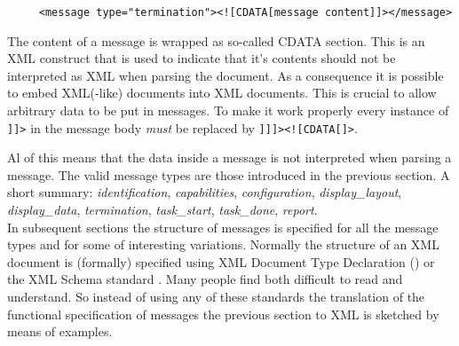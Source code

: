 \documentclass{article}
\begin{document}
    \begin{verbatim}
     <message type="termination"><![CDATA[message content]]></message>\end{verbatim}

    The content of a message is wrapped as so-called CDATA section. This is an
    XML construct that is used to indicate that it's contents should not be
    interpreted as XML when parsing the document. As a consequence it is
    possible to embed XML(-like) documents into XML documents. This is crucial
    to allow arbitrary data to be put in messages. To make it work properly
    every instance of \verb']]>' in the message body \textit{must} be replaced by
    \verb']]]><![CDATA[]>'.
    
    Al of this means that the data inside a message is not interpreted when
    parsing a message.  The valid message types are those introduced in the
    previous section. A short summary: \textit{identification},
    \textit{capabilities}, \textit{configuration}, \textit{display\_layout},
    \textit{display\_data}, \textit{termination}, \textit{task\_start},
    \textit{task\_done}, \textit{report}.
    \\[5pt]
    \noindent In subsequent sections the structure of messages is specified for
    all the message types and for some of interesting variations. Normally the
    structure of an XML document is (formally) specified using XML Document
    Type Declaration (\cite{Sperberg-McQueen:06:EML}) or the XML Schema
    standard \cite{Malhotra:06:XSP}. Many people find both difficult to read
    and understand. So instead of using any of these standards the translation
    of the functional specification of messages the previous section to XML is
    sketched by means of examples.


   
\end{document}
